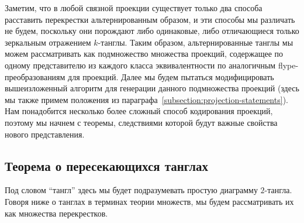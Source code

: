 \documentclass[12pt]{article}
\theoremstyle{plain}
\theoremstyle{definition}
\begin{document}
		Заметим, что в любой связной проекции существует только два способа расставить перекрестки альтернированным образом,
		и эти способы мы различать не будем, поскольку они порождают либо одинаковые, либо отличающиеся только зеркальным
		отражением $k$-танглы. Таким образом, альтернированные танглы мы можем рассматривать как подмножество множества проекций,
		содержащее по одному представителю из каждого класса эквивалентности по аналогичным flype-преобразованиям для проекций.
		Далее мы будем пытаться модифицировать вышеизложенный алгоритм для генерации данного подмножества проекций (здесь мы также
		примем положения из параграфа~\ref{subsection:projection-statements}). Нам понадобится несколько более сложный способ
		кодирования проекций, поэтому мы начнем с теоремы, следствиями которой будут важные свойства нового представления.

	\subsection{Теорема о пересекающихся танглах}

		Под словом ``тангл'' здесь мы будет подразумевать простую диаграмму $2$-тангла. Говоря ниже о танглах в терминах теории
		множеств, мы будем рассматривать их как множества перекрестков.
\end{document}
